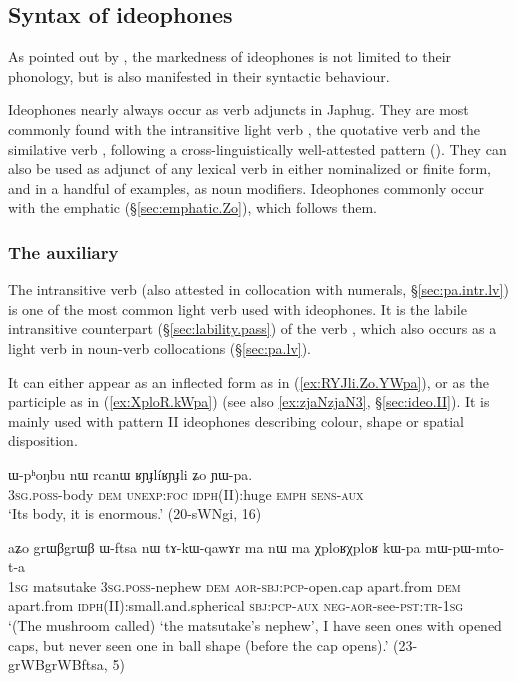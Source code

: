 \subsection{Syntax of ideophones} \label{sec:idph.syntax}
As pointed out by \citet[660]{dingemanse12ideo}, the markedness of ideophones is not limited to their phonology, but is also manifested in their syntactic behaviour.

Ideophones nearly always occur as verb adjuncts in Japhug. They are most commonly found with the intransitive light verb , the quotative verb  and the similative verb , following a cross-linguistically well-attested pattern (\citealt[280--288]{guldemann08quot}). They can also be used as adjunct of any lexical verb in either nominalized or finite form, and in a handful of examples, as noun modifiers. Ideophones commonly occur with the emphatic  (§\ref{sec:emphatic.Zo}), which follows them.

\subsubsection{The auxiliary } \label{sec:idph.pa}
The intransitive verb  (also attested in collocation with numerals, §\ref{sec:pa.intr.lv}) is one of the most common light verb used with ideophones. It is the labile intransitive counterpart (§\ref{sec:lability.pass}) of the verb , which also occurs as a light verb in noun-verb collocations (§\ref{sec:pa.lv}). 

It can either appear as an inflected form as in (\ref{ex:RYJli.Zo.YWpa}), or as the participle  as in (\ref{ex:XploR.kWpa}) (see also \ref{ex:zjaNzjaN3}, §\ref{sec:ideo.II}). It is mainly used with pattern II ideophones describing colour, shape or spatial disposition.

 
\begin{exe}
\ex \label{ex:RYJli.Zo.YWpa}
\gll ɯ-pʰoŋbu nɯ rcanɯ ʁɲɟlíʁɲɟli ʑo ɲɯ-pa. \\
\textsc{3sg}.\textsc{poss}-body \textsc{dem} \textsc{unexp}:\textsc{foc} \textsc{idph}(II):huge \textsc{emph} \textsc{sens}-\textsc{aux} \\
\glt  `Its body, it is enormous.' (20-sWNgi, 16)
\end{exe}

\begin{exe}
\ex \label{ex:XploR.kWpa}
\gll aʑo grɯβgrɯβ ɯ-ftsa nɯ tɤ-kɯ-qawɤr ma nɯ ma χploʁχploʁ kɯ-pa mɯ-pɯ-mto-t-a \\
\textsc{1sg} matsutake \textsc{3sg}.\textsc{poss}-nephew \textsc{dem} \textsc{aor}-\textsc{sbj}:\textsc{pcp}-open.cap apart.from \textsc{dem} apart.from \textsc{idph}(II):small.and.spherical \textsc{sbj}:\textsc{pcp}-\textsc{aux} \textsc{neg}-\textsc{aor}-see-\textsc{pst}:\textsc{tr}-\textsc{1sg} \\
\glt `(The mushroom called) `the matsutake's nephew', I have seen ones with opened caps, but never seen one in ball shape (before the cap opens).' (23-grWBgrWBftsa, 5)
\end{exe}


